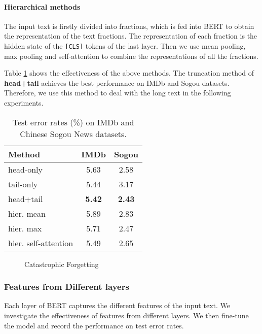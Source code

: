 \documentclass[11pt,a4paper]{article}
\theoremstyle{definition}
\begin{document}
\begin{CJK*}{UTF8}{gbsn}
\paragraph{Hierarchical methods}
The input text is firstly divided into  fractions, which is fed into BERT to obtain the representation of the  text fractions. The representation of each fraction is the hidden state of the \texttt{[CLS]} tokens of the last layer. Then we use mean pooling, max pooling and self-attention to combine the representations of all the fractions.

Table \ref{tb:longtext} shows the effectiveness of the above methods. The truncation method of \textbf{head+tail} achieves the best performance on IMDb and Sogou datasets. Therefore, we use this method to deal with the long text in the following experiments.

	\begin{table}[ht!]\small\setlength{\tabcolsep}{8pt}
		\centering
		\begin{tabular}{l c c}
			\toprule
			Method & IMDb & Sogou \\
			\midrule
			head-only & 5.63 & 2.58 \\
			tail-only & 5.44 & 3.17 \\
			head+tail & \textbf{5.42} & \textbf{2.43} \\
			hier. mean & 5.89 & 2.83  \\
			hier. max & 5.71 & 2.47 \\
			hier. self-attention & 5.49 & 2.65 \\			
			\bottomrule
		\end{tabular}
		\caption{Test error rates (\%) on IMDb and Chinese Sogou News datasets.
		}\label{tb:longtext}
	\end{table}	

\begin{figure*}[h!]
\centering
{}
	\caption{Catastrophic Forgetting}\label{fig:cat-forget}
\end{figure*}

\subsubsection{Features from Different layers}
Each layer of BERT captures the different features of the input text. We investigate the effectiveness of features from different layers. We then fine-tune the model and record the performance on test error rates.


\end{CJK*}
\end{document}
